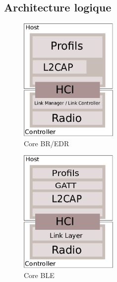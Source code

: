 \subsection{Architecture logique}
\begin{frame}


\begin{minipage}[t]{0.47\linewidth}
	\begin{figure}
		\includegraphics[height=6cm]{arch_core.png}
		\caption{Core BR/EDR}
	\end{figure}
\end{minipage}
\begin{minipage}[t]{0.45\linewidth}
	\begin{figure}
		\includegraphics[height=6cm]{arch_core_ble.png}
		\caption{Core BLE}
	\end{figure}
\end{minipage}
\end{frame}


